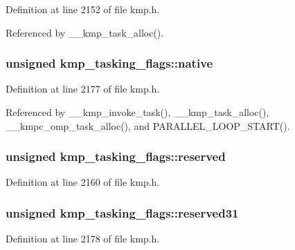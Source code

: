 Definition at line 2152 of file kmp.\-h.



Referenced by \-\_\-\-\_\-kmp\-\_\-task\-\_\-alloc().

\hypertarget{structkmp__tasking__flags_a6e26667bc33ef72a60338aaf00497f3a}{
\subsubsection[{native}]{\setlength{\rightskip}{0pt plus 5cm}unsigned kmp\-\_\-tasking\-\_\-flags\-::native}}\label{structkmp__tasking__flags_a6e26667bc33ef72a60338aaf00497f3a}


Definition at line 2177 of file kmp.\-h.



Referenced by \-\_\-\-\_\-kmp\-\_\-invoke\-\_\-task(), \-\_\-\-\_\-kmp\-\_\-task\-\_\-alloc(), \-\_\-\-\_\-kmpc\-\_\-omp\-\_\-task\-\_\-alloc(), and P\-A\-R\-A\-L\-L\-E\-L\-\_\-\-L\-O\-O\-P\-\_\-\-S\-T\-A\-R\-T().

\hypertarget{structkmp__tasking__flags_a5b6670b83f5fc82d678e44f8eec4fbf2}{
\subsubsection[{reserved}]{\setlength{\rightskip}{0pt plus 5cm}unsigned kmp\-\_\-tasking\-\_\-flags\-::reserved}}\label{structkmp__tasking__flags_a5b6670b83f5fc82d678e44f8eec4fbf2}


Definition at line 2160 of file kmp.\-h.

\hypertarget{structkmp__tasking__flags_a83c321dce84008628bb9b6f37653dda2}{
\subsubsection[{reserved31}]{\setlength{\rightskip}{0pt plus 5cm}unsigned kmp\-\_\-tasking\-\_\-flags\-::reserved31}}\label{structkmp__tasking__flags_a83c321dce84008628bb9b6f37653dda2}


Definition at line 2178 of file kmp.\-h.

